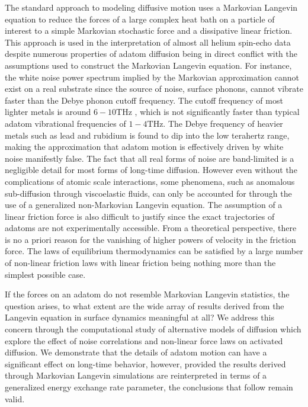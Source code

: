 \documentclass[7pt]{article}
\newcommand{\THz}{\si{\tera\hertz}}
\begin{document}
The standard approach to modeling diffusive motion uses a Markovian Langevin equation to reduce the forces of a large complex heat bath on a particle of interest to a simple Markovian stochastic force and a dissipative linear friction\cite{Kramers, Zwanzig, Kubo}. This approach is used in the interpretation of almost all helium spin-echo data despite numerous properties of adatom diffusion being in direct conflict with the assumptions used to construct the Markovian Langevin equation.  For instance, the white noise power spectrum implied by the Markovian approximation cannot exist on a real substrate since the source of noise, surface phonons, cannot vibrate faster than the Debye phonon cutoff frequency. The cutoff frequency of most lighter metals is around $6-10\THz$ \cite{Sinha, Rao, Zarestky, Stedman1966}, which is not significantly faster than typical adatom vibrational frequencies of $1-4\THz$\cite{Ellis1995, Senet1999LowfrequencyVO, Hofmann1996}. The Debye frequency of heavier metals such as lead and rubidium is found to dip into the low terahertz range\cite{Brockhouse, Copley1973}, making the approximation that adatom motion is effectively driven by white noise manifestly false. The fact that all real forms of noise are band-limited is a negligible detail for most forms of long-time diffusion\cite{Townsend2018, GlattHoltz2020}. However even without the complications of atomic scale interactions, some phenomena, such as anomalous sub-diffusion through viscoelastic fluids, can only be accounted for through the use of a generalized non-Markovian Langevin equation\cite{Kubo, GlattHoltz2020, Mason}. The assumption of a linear friction force is also difficult to justify since the exact trajectories of adatoms are not experimentally accessible. From a theoretical perspective, there is no a priori reason for the vanishing of higher powers of velocity in the friction force\cite{Kramers}. The laws of equilibrium thermodynamics can be satisfied by a large number of non-linear friction laws with linear friction being nothing more than the simplest possible case. 

If the forces on an adatom do not resemble Markovian Langevin statistics, the question arises, to what extent are the wide array of results derived from the Langevin equation in surface dynamics meaningful at all? We address this concern through the computational study of alternative models of diffusion which explore the effect of noise correlations and non-linear force laws on activated diffusion. We demonstrate that the details of adatom motion can have a significant effect on long-time behavior, however, provided the results derived through Markovian Langevin simulations are reinterpreted in terms of a generalized energy exchange rate parameter, the conclusions that follow remain valid. 
\end{document}
